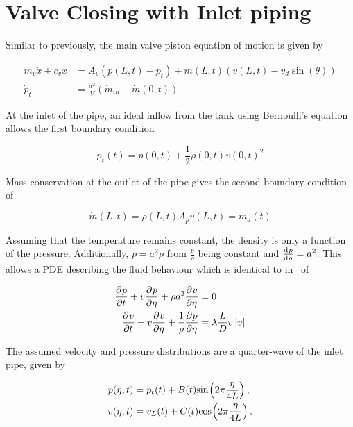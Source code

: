 \section{Valve Closing with Inlet piping}

Similar to previously, the main valve piston equation of motion is given by

\begin{equation*}
\begin{split}
    m_v \ddot{x} + c_v \dot{x} &= A_v \left( p(L,t) - p_t \right) + \dot{m}(L,t) \left( v(L,t) - v_d \sin(\theta) \right) \\
    \dot{p}_t &= \frac{a^2}{V} \left( \dot{m}_{in} - \dot{m}(0,t) \right)
\end{split}
\end{equation*}

At the inlet of the pipe, an ideal inflow from the tank using Bernoulli's equation allows the first boundary condition

\begin{equation*}
    p_t(t) = p(0,t) + \frac{1}{2} \rho(0,t) v(0,t)^2
\end{equation*}

Mass conservation at the outlet of the pipe gives the second boundary condition of

\begin{equation*}
    \dot{m}(L,t) = \rho(L,t) A_p v(L,t) = \dot{m}_d(t)
\end{equation*}

Assuming that the temperature remains constant, the density is only a function of the pressure. Additionally, $p = a^2 \rho$ from $\frac{p}{\rho}$ being constant and $\diff{p}{\rho} = a^2$. This allows a PDE describing the fluid behaviour which is identical to in~\cite{Hos2015ModelPipe} of

\begin{equation} \label{eq: FluidPDE}
\begin{split}
    \pdiff{p}{t} + v \pdiff{p}{\eta} + \rho a^2 \pdiff{v}{\eta} &= 0 \\
    \pdiff{v}{t} + v \pdiff{v}{\eta} + \frac{1}{\rho} \pdiff{p}{\eta} &= \lambda \frac{L}{D} v \left| v \right|
\end{split}
\end{equation}

The assumed velocity and pressure distributions are a quarter-wave of the inlet pipe, given by

\begin{equation} \label{eq: PressVelDist}
\begin{split}
    p(\eta,t) &= p_t(t) + B(t) \fun{sin}{2\pi \frac{\eta}{4L}} \, ,\\
    v(\eta,t) &= v_L(t) + C(t) \fun{cos}{2\pi \frac{\eta}{4L}} \, .
\end{split}
\end{equation}

